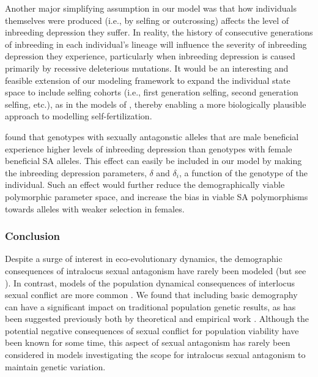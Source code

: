 \documentclass[11pt]{article}
\begin{document}
Another major simplifying assumption in our model was that how individuals themselves were produced (i.e., by selfing or outcrossing) affects the level of inbreeding depression they suffer. In reality, the history of consecutive generations of inbreeding in each individual's lineage will influence the severity of inbreeding depression they experience, particularly when inbreeding depression is caused primarily by recessive deleterious mutations. It would be an interesting and feasible extension of our modeling framework to expand the individual state space to include selfing cohorts (i.e., first generation selfing, second generation selfing, etc.), as in the models of \citet{kelly1999response,kelly2007mutation}, thereby enabling a more biologically plausible approach to modelling self-fertilization.

\cite{grieshop2017male} found that genotypes with sexually antagonstic alleles that are male beneficial experience higher levels of inbreeding depression than genotypes with female beneficial SA alleles. This effect can easily be included in our model by making the inbreeding depression parameters, $\delta$ and $\delta_i$, a function of the genotype of the individual. Such an effect would further reduce the demographically viable polymorphic parameter space, and increase the bias in viable SA polymorphisms towards alleles with weaker selection in females.


\subsubsection*{Conclusion} 

Despite a surge of interest in eco-evolutionary dynamics, the demographic consequences of intralocus sexual antagonism have rarely been modeled (but see \citealt{harts2014demography,kokko2003sexy, MatthewsConnallon2019}). In contrast, models of the population dynamical consequences of interlocus sexual conflict are more common \citep[e.g.,][]{tanaka1996sexual, martinez2017sexual}. We found that including basic demography can have a significant impact on traditional population genetic results, as has been suggested previously both by theoretical and empirical work \citep{kokko2003sexy, berger2016intralocus, grieshop2017male}. Although the potential negative consequences of sexual conflict for population viability have been known for some time, this aspect of sexual antagonism has rarely been considered in models investigating the scope for intralocus sexual antagonism to maintain genetic variation. 
\end{document}
